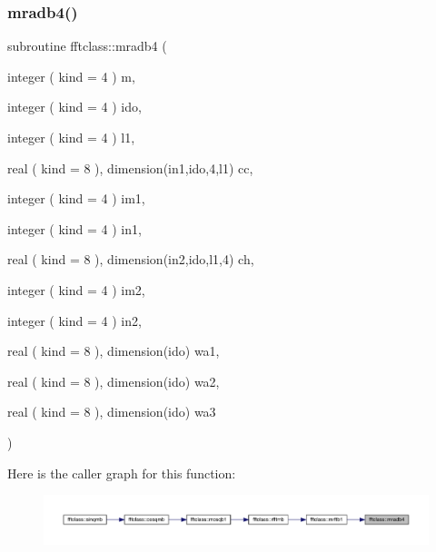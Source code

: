\subsubsection{\texorpdfstring{mradb4()}{mradb4()}}
{\footnotesize\ttfamily subroutine fftclass\+::mradb4 (\begin{DoxyParamCaption}\item[{integer ( kind = 4 )}]{m,  }\item[{integer ( kind = 4 )}]{ido,  }\item[{integer ( kind = 4 )}]{l1,  }\item[{real ( kind = 8 ), dimension(in1,ido,4,l1)}]{cc,  }\item[{integer ( kind = 4 )}]{im1,  }\item[{integer ( kind = 4 )}]{in1,  }\item[{real ( kind = 8 ), dimension(in2,ido,l1,4)}]{ch,  }\item[{integer ( kind = 4 )}]{im2,  }\item[{integer ( kind = 4 )}]{in2,  }\item[{real ( kind = 8 ), dimension(ido)}]{wa1,  }\item[{real ( kind = 8 ), dimension(ido)}]{wa2,  }\item[{real ( kind = 8 ), dimension(ido)}]{wa3 }\end{DoxyParamCaption})}

Here is the caller graph for this function\+:\nopagebreak
\begin{figure}[H]
\begin{center}
\leavevmode
\includegraphics[width=350pt]{namespacefftclass_a5aae50728c25b5089b6b3c61d3ef27eb_icgraph}
\end{center}
\end{figure}
\mbox{\label{namespacefftclass_a69781205c1568e37470a06e001a0dae7}} 
